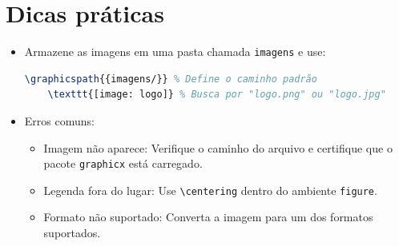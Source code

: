 \section{Dicas práticas}
\begin{itemize}
    \item Armazene as imagens em uma pasta chamada \verb|imagens| e use:
    \begin{lstlisting}[language=tex, caption=Exemplo de customização do tamanho e ângulo de imagem]
    \graphicspath{{imagens/}} % Define o caminho padrão
    \texttt{[image: logo]} % Busca por "logo.png" ou "logo.jpg"
    \end{lstlisting}
    \item Erros comuns:
    \begin{itemize}
        \item Imagem não aparece: Verifique o caminho do arquivo e certifique que o pacote \verb|graphicx| está carregado.
        \item Legenda fora do lugar: Use \verb|\centering| dentro do ambiente \verb|figure|.
        \item Formato não suportado: Converta a imagem para um dos formatos suportados. 
    \end{itemize}
    
\end{itemize}
